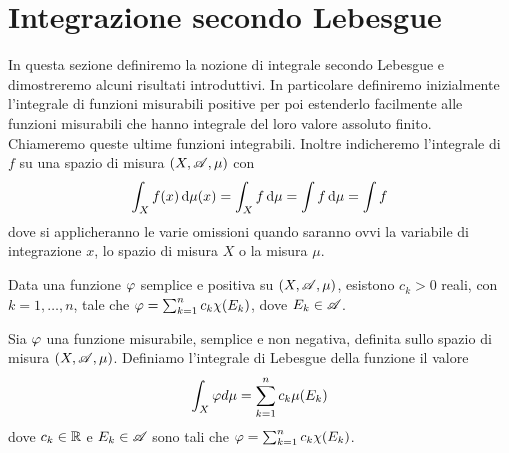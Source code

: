 \section{Integrazione secondo Lebesgue}
In questa sezione definiremo la nozione di integrale secondo Lebesgue e dimostreremo alcuni risultati introduttivi. In particolare definiremo inizialmente l'integrale di funzioni misurabili positive per poi estenderlo facilmente alle funzioni misurabili che hanno integrale del loro valore assoluto finito. Chiameremo queste ultime funzioni integrabili. Inoltre indicheremo l'integrale di $f$ su una spazio di misura $(X,\mathscr A,\mu)$ con 
\begin{equation*}
	\int_X f(x) \,\mathrm d \mu(x)=\int_X f \,\mathrm d \mu=\int f \,\mathrm d \mu=\int f
\end{equation*}
dove si applicheranno le varie omissioni quando saranno ovvi la variabile di integrazione $x$, lo spazio di misura $X$ o la misura $\mu$.

\begin{lemma}
	Data una funzione $\varphi$ semplice e positiva su $(X,\mathscr A,\mu)$, esistono $c_k>0$ reali, con $k=1,\dots, n$, tale che $\varphi=\sum_{k=1}^nc_k\chi(E_k)$, dove $E_k\in \mathscr A$.
\end{lemma}


\begin{definition}\label{DefIntSemp}
	Sia $\varphi$ una funzione misurabile, semplice e non negativa, definita sullo spazio di misura $(X,\mathscr A,\mu)$. Definiamo l'integrale di Lebesgue della funzione il valore
	\begin{equation*}
		\int_X \varphi d \mu = \sum_{k=1}^n c_k\mu(E_k)
	\end{equation*}
	dove $c_k\in \mathbb R$ e $E_k \in \mathscr A$ sono tali che $\varphi=\sum_{k=1}^nc_k\chi(E_k)$.
\end{definition}

